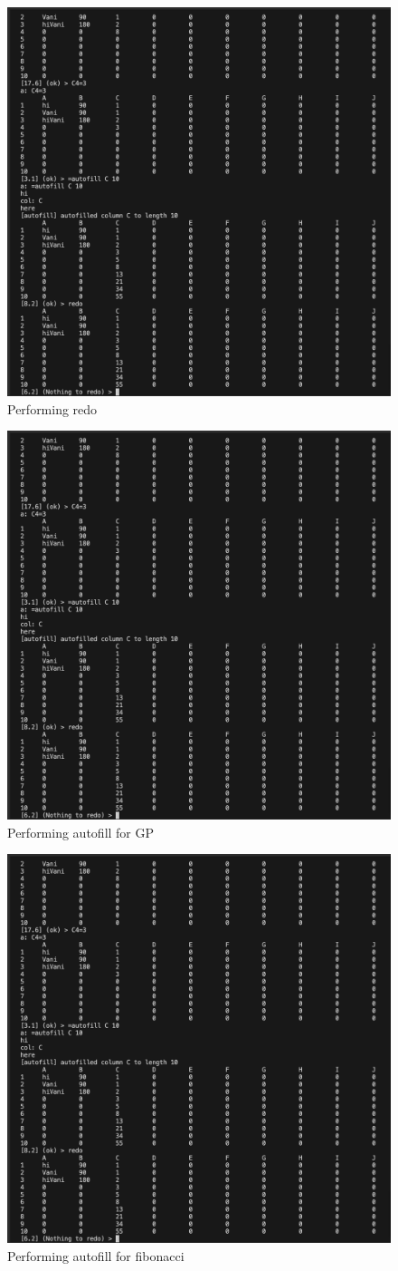         \begin{figure}[H]
            \centering
            \includegraphics[width=0.5\linewidth]{image.png}
            \caption{Performing redo}
            \label{fig:enter-label}
        \end{figure}
        
        \begin{figure}[H]
            \centering
            \includegraphics[width=0.5\linewidth]{image.png}
            \caption{Performing autofill for GP}
            \label{fig:enter-label}
        \end{figure}
        
        \begin{figure}[H]
            \centering
            \includegraphics[width=0.5\linewidth]{image.png}
            \caption{Performing autofill for fibonacci}
            \label{fig:enter-label}
        \end{figure}
        
